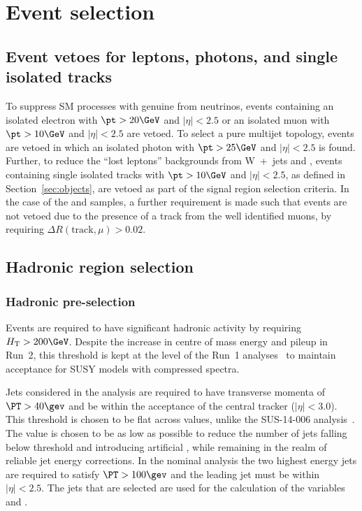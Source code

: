 \section{Event selection}
\label{sec:selection}

\subsection{Event vetoes for leptons, photons, and single isolated tracks\label{sec:vetoes}}

To suppress SM processes with genuine \met from neutrinos, events
containing an isolated electron with $\pt > 20\GeV$ and $|\eta| < 2.5$ or an isolated muon
with $\pt > 10\GeV$ and $|\eta| < 2.5$ are vetoed. To select a pure
multijet topology, events are vetoed in which an isolated
photon with $\pt > 25\GeV$ and $|\eta| < 2.5$ is
found.  Further, to reduce the ``lost leptons'' backgrounds from W~+~jets 
and \ttbar, events containing single isolated tracks with $\pt >
10\GeV$ and $|\eta| < 2.5$, as defined in
Section~\ref{sec:objects}, are vetoed as part of the signal
region selection criteria. In the case of the \mj and \mmj
samples, a further requirement is made such that events are not vetoed
due to the presence of a track from the well identified muons, by
requiring $\Delta R(\textrm{track},\mu) > 0.02$.


\subsection{Hadronic region selection}
\label{sec:hadSelection}

\subsubsection{Hadronic pre-selection}
Events are required to have significant hadronic activity by requiring
$\scalht > 200\GeV$. Despite the increase in centre of mass energy and pileup
in Run~2, this threshold is kept at the level of the Run~1 analyses~\cite{Chatrchyan:2013lya}  
to maintain acceptance for SUSY models with compressed spectra.

Jets considered in the analysis are required to have transverse momenta of $\PT>40\gev$ and be
within the acceptance of the central tracker ($|\eta|<3.0$). This threshold is chosen
to be flat across \HT values, unlike the SUS-14-006 analysis~\cite{CMS_AN_2013-366}. The \PT value is
chosen to be as low as possible to reduce the number of jets falling below
threshold and introducing artificial \mht, while remaining in the realm of
reliable jet energy corrections. In the nominal analysis the two highest energy jets
are required to satisfy $\PT>100\gev$ and the leading jet must be within $|\eta|<2.5$. 
The jets that are selected are used for the calculation of the variables \HT and \mht.

